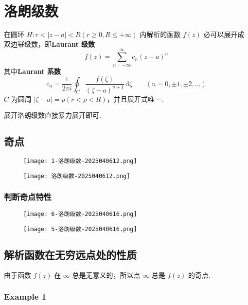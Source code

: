 \section{洛朗级数}

\begin{theorem}[Laurant 定理]
在圆环 $H:r<\lvert z-a \rvert<R(r\geq0,R\leq+\infty)$ 内解析的函数 $f(z)$ 必可以展开成双边幂级数，即\textbf{Laurant 级数}
\[
f(z)=\sum_{n=-\infty}^{\infty} c_n(z-a)^{n}
\]
其中\textbf{Laurant 系数}
\[
c_n=\frac{1}{2\pi i} \oint_{C} \frac{f(\zeta)}{(\zeta-a)^{n+1}} \, \mathrm{d}\zeta \qquad (n=0,\pm1,\pm2,\dots) 
\]
$C$ 为圆周 $\lvert \zeta-a \rvert=\rho(r<\rho<R)$，并且展开式唯一.
\end{theorem}
展开洛朗级数直接暴力展开即可.

\subsection{奇点}

\begin{figure}[H]
\centering
\texttt{[image: 1-洛朗级数-2025040612.png]}
\label{}
\end{figure}
\begin{figure}[H]
\centering
\texttt{[image: 洛朗级数-2025040612.png]}
\label{}
\end{figure}

\subsubsection{判断奇点特性}

\begin{figure}[H]
\centering
\texttt{[image: 6-洛朗级数-2025040616.png]}
\label{}
\end{figure}
\begin{figure}[H]
\centering
\texttt{[image: 5-洛朗级数-2025040616.png]}
\label{}
\end{figure}

\subsection{解析函数在无穷远点处的性质}

由于函数 $f(z)$ 在 $\infty$ 总是无意义的，所以点 $\infty$ 总是 $f(z)$ 的奇点.

\subsubsection{Example 1}

